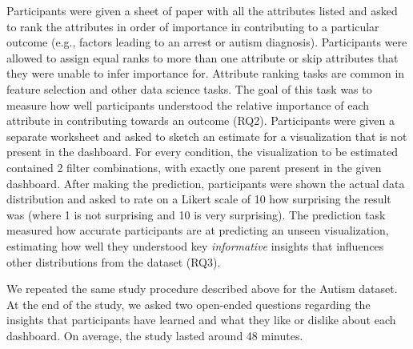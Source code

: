 Participants were given a sheet of paper with all the attributes listed and asked to rank the attributes in order of importance in contributing to a particular outcome (e.g., factors leading to an arrest or autism diagnosis). Participants were allowed to assign equal ranks to more than one attribute or skip attributes that they were unable to infer importance for. Attribute ranking tasks are common in feature selection and other data science tasks. The goal of this task was to measure how well participants  understood the relative importance of each attribute in contributing towards an outcome (RQ2).
 Participants were given a separate worksheet and asked to sketch an estimate for a visualization that is not present in the dashboard. For every condition, the visualization to be estimated contained 2 filter combinations, with exactly one parent present in the given dashboard. After making the prediction, participants were shown the actual data distribution and asked to rate on a Likert scale of 10 how surprising the result was (where 1 is not surprising and 10 is very surprising). The prediction task measured how accurate participants are at predicting an unseen visualization, estimating how well they understood key \emph{informative} insights that influences other distributions from the dataset (RQ3).
\par We repeated the same study procedure described above for the Autism dataset. At the end of the study, we asked two open-ended questions regarding the insights that participants have learned and what they like or dislike about each dashboard. On average, the study lasted around 48 minutes.

